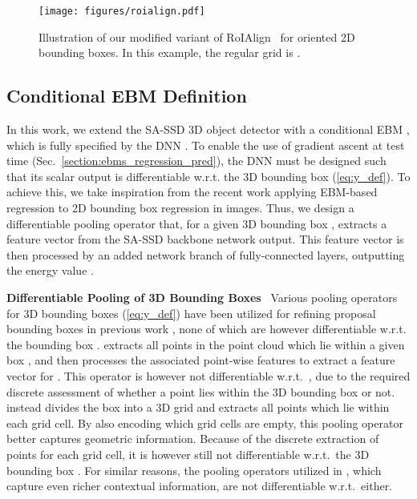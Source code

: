\documentclass[letterpaper, 10 pt, conference]{ieeeconf}
\newcommand{\parsection}[1]{\vspace{2mm}\noindent\textbf{#1}~ }
\begin{document}
\begin{figure}[t]
    \centering
    \texttt{[image: figures/roialign.pdf]}\vspace{-2.0mm}
    \caption{Illustration of our modified variant of RoIAlign~\cite{He2017MaskR} for oriented 2D bounding boxes. In this example, the regular  grid is .}\vspace{-3mm}
    \label{fig:modified_roialign}
\end{figure}

\subsection{Conditional EBM Definition}
\label{section:method_architecture}
In this work, we extend the SA-SSD 3D object detector with a conditional EBM , which is fully specified by the DNN . To enable the use of gradient ascent at test time (Sec.~\ref{section:ebms_regression_pred}), the DNN must be designed such that its scalar output  is differentiable w.r.t. the 3D bounding box  (\ref{eq:y_def}). To achieve this, we take inspiration from the recent work \cite{gustafsson2019learning, danelljan2020probabilistic, gustafsson2020train} applying EBM-based regression to 2D bounding box regression in images. Thus, we design a differentiable pooling operator that, for a given 3D bounding box , extracts a feature vector from the SA-SSD backbone network output. This feature vector is then processed by an added network branch of fully-connected layers, outputting the energy value .


\parsection{Differentiable Pooling of 3D Bounding Boxes}
Various pooling operators for 3D bounding boxes  (\ref{eq:y_def}) have been utilized for refining proposal bounding boxes in previous work \cite{shi2019pointrcnn, shi2020points, yang2019std, shi2020pv}, none of which are however differentiable w.r.t. the bounding box . \cite{shi2019pointrcnn} extracts all points in the point cloud  which lie within a given box , and then processes the associated point-wise features to extract a feature vector for . This operator is however not differentiable w.r.t.\ , due to the required discrete assessment of whether a point  lies within the 3D bounding box  or not. \cite{shi2020points} instead divides the box  into a 3D grid and extracts all points which lie within each grid cell. By also encoding which grid cells are empty, this pooling operator better captures geometric information. Because of the discrete extraction of points for each grid cell, it is however still not differentiable w.r.t.\ the 3D bounding box . For similar reasons, the pooling operators utilized in \cite{yang2019std, shi2020pv}, which capture even richer contextual information, are not differentiable w.r.t.\  either.
\end{document}
